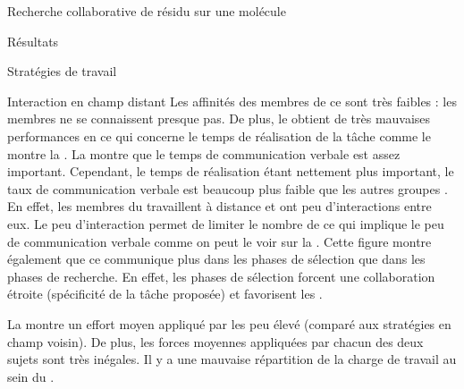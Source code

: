\documentclass[myfrancais]{mythesis}
\begin{document}
\begin{mychapter}{Recherche collaborative de résidu sur une molécule}
\begin{mysection}{Résultats}
\begin{mysubsection}{Stratégies de travail}
\begin{mysubsubsection}{Interaction en champ distant}
					Les affinités des membres de ce  sont très faibles  : les membres ne se connaissent presque pas.
					De plus, le  obtient de très mauvaises performances en ce qui concerne le temps de réalisation de la tâche comme le montre la .
					La  montre que le temps de communication verbale est assez important.
					Cependant, le temps de réalisation étant nettement plus important, le taux de communication verbale est beaucoup plus faible que les autres groupes .
					En effet, les membres du  travaillent à distance et ont peu d'interactions entre eux.
					Le peu d'interaction permet de limiter le nombre de  ce qui implique le peu de communication verbale comme on peut le voir sur la .
					Cette figure montre également que ce  communique plus dans les phases de sélection que dans les phases de recherche.
					En effet, les phases de sélection forcent une collaboration étroite (spécificité de la tâche proposée) et favorisent les .

					La  montre un effort moyen appliqué par les  peu élevé (comparé aux stratégies en champ voisin).
					De plus, les forces moyennes appliquées par chacun des deux sujets sont très inégales.
					Il y a une mauvaise répartition de la charge de travail au sein du .


\end{mysubsubsection}
\end{mysubsection}
\end{mysection}
\end{mychapter}
\end{document}
